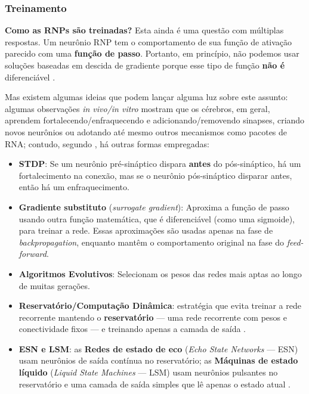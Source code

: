		\subsubsection{Treinamento}
		
			\par \textbf{Como as RNPs são treinadas?} Esta ainda é uma questão com múltiplas respostas. Um neurônio RNP tem o comportamento de sua função de ativação parecido com uma \textbf{função de passo}. Portanto, em princípio, não podemos usar soluções baseadas em descida de gradiente porque esse tipo de função \textbf{não é} diferenciável \cite{kasabov2019time}.
			
			\par Mas existem algumas ideias que podem lançar alguma luz sobre este assunto: algumas observações \textit{in vivo/in vitro} mostram que os cérebros, em geral, aprendem fortalecendo/enfraquecendo e adicionando/removendo sinapses, criando novos neurônios ou adotando até mesmo outros mecanismos como pacotes de RNA; contudo, segundo , há outras formas empregadas:
			
			\begin{itemize}
				\item \textbf{\ac{STDP}}: Se um neurônio pré-sináptico dispara \textbf{antes} do pós-sináptico, há um fortalecimento na conexão, mas se o neurônio pós-sináptico disparar antes, então há um enfraquecimento.
				
				\item \textbf{Gradiente substituto} (\textit{surrogate gradient}): Aproxima a função de passo usando outra função matemática, que é diferenciável (como uma sigmoide), para treinar a rede. Essas aproximações são usadas apenas na fase de \textit{backpropagation}, enquanto mantêm o comportamento original na fase do \textit{feed-forward}.
				
				\item \textbf{Algoritmos Evolutivos}: Selecionam os pesos das redes mais aptas ao longo de muitas gerações.
				
				\item \textbf{Reservatório/Computação Dinâmica}: estratégia que evita treinar a rede recorrente mantendo o \textbf{reservatório} --- uma rede recorrente com pesos e conectividade fixos --- e treinando apenas a camada de saída \cite{kasabov2019time}.

				\item \textbf{ESN e LSM}: as \textbf{Redes de estado de eco} (\textit{Echo State Networks} --- ESN) usam neurônios de saída contínua no reservatório; as \textbf{Máquinas de estado líquido} (\textit{Liquid State Machines} --- LSM) usam neurônios pulsantes no reservatório e uma camada de saída simples que lê apenas o estado atual \cite{6789852}.
			\end{itemize}

